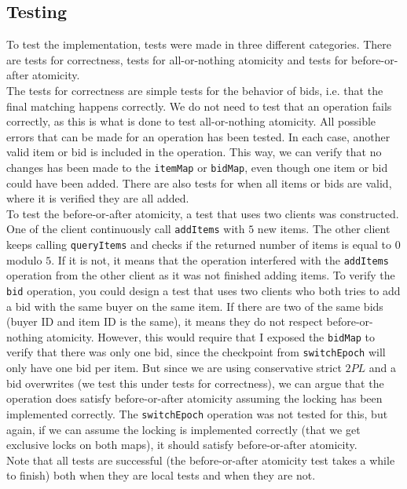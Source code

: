 \documentclass[a4paper]{article}
\begin{document}
\subsection{Testing}
To test the implementation, tests were made in three different categories. There are tests for correctness, tests for all-or-nothing atomicity and tests for before-or-after atomicity. \\
The tests for correctness are simple tests for the behavior of bids, i.e. that the final matching happens correctly. We do not need to test that an operation fails correctly, as this is what is done to test all-or-nothing atomicity. All possible errors that can be made for an operation has been tested. In each case, another valid item or bid is included in the operation. This way, we can verify that no changes has been made to the \texttt{itemMap} or \texttt{bidMap}, even though one item or bid could have been added. There are also tests for when all items or bids are valid, where it is verified they are all added. \\
To test the before-or-after atomicity, a test that uses two clients was constructed. One of the client continuously call \texttt{addItems} with $5$ new items. The other client keeps calling \texttt{queryItems} and checks if the returned number of items is equal to $0$ modulo $5$. If it is not, it means that the operation interfered with the \texttt{addItems} operation from the other client as it was not finished adding items. To verify the \texttt{bid} operation, you could design a test that uses two clients who both tries to add a bid with the same buyer on the same item. If there are two of the same bids (buyer ID and item ID is the same), it means they do not respect before-or-nothing atomicity. However, this would require that I exposed the \texttt{bidMap} to verify that there was only one bid, since the checkpoint from \texttt{switchEpoch} will only have one bid per item. But since we are using conservative strict $2PL$ and a bid overwrites (we test this under tests for correctness), we can argue that the operation does satisfy before-or-after atomicity assuming the locking has been implemented correctly. The \texttt{switchEpoch} operation was not tested for this, but again, if we can assume the locking is implemented correctly (that we get exclusive locks on both maps), it should satisfy before-or-after atomicity. \\
Note that all tests are successful (the before-or-after atomicity test takes a while to finish) both when they are local tests and when they are not.
\end{document}

